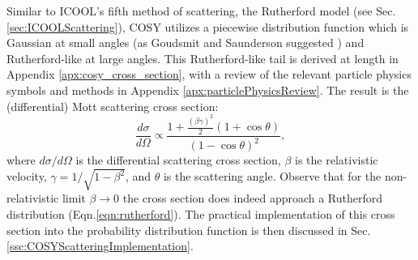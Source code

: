 %
%
 \label{sec:COSYScattering}\par
Similar to ICOOL's fifth method of scattering, the Rutherford model (see Sec. \ref{sec:ICOOLScattering}), COSY utilizes a piecewise distribution function which is Gaussian  at small angles (as Goudsmit and Saunderson suggested \cite{gs}) and Rutherford-like at large angles. This Rutherford-like tail is derived at length in Appendix \ref{apx:cosy_cross_section}, with a review of the relevant particle physics symbols and methods in Appendix \ref{apx:particlePhysicsReview}. The result is the (differential) Mott scattering cross section:
\begin{equation}\label{eqn:MottCrossSection}
\frac{d\sigma}{d\Omega} \propto \frac{1+\frac{(\beta\gamma)^2}{2} (1+\cos\theta)  }{(1-\cos\theta)^2},
\end{equation}
where $d\sigma/d\Omega$ is the differential scattering cross section, $\beta$ is the relativistic velocity, $\gamma=1/\sqrt{1-\beta^2}$, and $\theta$ is the scattering angle. Observe that for the non-relativistic limit $\beta\rightarrow 0$ the cross section does indeed approach a Rutherford distribution (Eqn.\ref{eqn:rutherford}). The practical implementation of this cross section into the probability distribution function is then discussed in Sec. \ref{ssc:COSYScatteringImplementation}.

